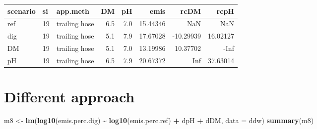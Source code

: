 \documentclass[
]{article}
\newenvironment{Shaded}{\begin{snugshade}}{\end{snugshade}}
\newcommand{\AttributeTok}[1]{\textcolor[rgb]{0.13,0.29,0.53}{#1}}
\newcommand{\FunctionTok}[1]{\textcolor[rgb]{0.13,0.29,0.53}{\textbf{#1}}}
\newcommand{\NormalTok}[1]{#1}
\newcommand{\OtherTok}[1]{\textcolor[rgb]{0.56,0.35,0.01}{#1}}
\newcommand{\SpecialCharTok}[1]{\textcolor[rgb]{0.81,0.36,0.00}{\textbf{#1}}}
\begin{document}
\begin{longtable}[]{@{}lllrrrrr@{}}
\toprule\noalign{}
scenario & si & app.meth & DM & pH & emis & rcDM & rcpH \\
\midrule\noalign{}
\endhead
\bottomrule\noalign{}
\endlastfoot
ref & 19 & trailing hose & 6.5 & 7.0 & 15.44346 & NaN & NaN \\
dig & 19 & trailing hose & 5.1 & 7.9 & 17.67028 & -10.29939 &
16.02127 \\
DM & 19 & trailing hose & 5.1 & 7.0 & 13.19986 & 10.37702 & -Inf \\
pH & 19 & trailing hose & 6.5 & 7.9 & 20.67372 & Inf & 37.63014 \\
\end{longtable}

\hypertarget{different-approach}{%
\section{Different approach}\label{different-approach}}

\begin{Shaded}
\end{Shaded}

\begin{Shaded}
\begin{Highlighting}[]
\NormalTok{m8 }\OtherTok{\textless{}{-}} \FunctionTok{lm}\NormalTok{(}\FunctionTok{log10}\NormalTok{(emis.perc.dig) }\SpecialCharTok{\textasciitilde{}} \FunctionTok{log10}\NormalTok{(emis.perc.ref) }\SpecialCharTok{+}\NormalTok{ dpH }\SpecialCharTok{+}\NormalTok{ dDM, }\AttributeTok{data =}\NormalTok{ ddw)}
\FunctionTok{summary}\NormalTok{(m8)}
\end{Highlighting}
\end{Shaded}
\end{document}
